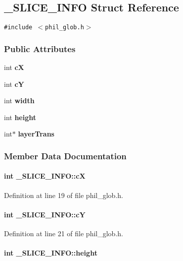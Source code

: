 \subsection{\_\-SLICE\_\-INFO  Struct Reference}
\label{_SLICE_INFO}
{\tt \#include $<$phil\_\-glob.h$>$}

\subsubsection*{Public Attributes}
\begin{CompactItemize}
\item 
int {\bf c\-X}
\item 
int {\bf c\-Y}
\item 
int {\bf width}
\item 
int {\bf height}
\item 
int$\ast$ {\bf layer\-Trans}
\end{CompactItemize}


\subsubsection{Member Data Documentation}
\label{_SLICE_INFO_m0}
\paragraph{\setlength{\rightskip}{0pt plus 5cm}int \_\-SLICE\_\-INFO::c\-X}\hfill



Definition at line 19 of file phil\_\-glob.h.\label{_SLICE_INFO_m1}
\paragraph{\setlength{\rightskip}{0pt plus 5cm}int \_\-SLICE\_\-INFO::c\-Y}\hfill



Definition at line 21 of file phil\_\-glob.h.\label{_SLICE_INFO_m3}
\paragraph{\setlength{\rightskip}{0pt plus 5cm}int \_\-SLICE\_\-INFO::height}\hfill



